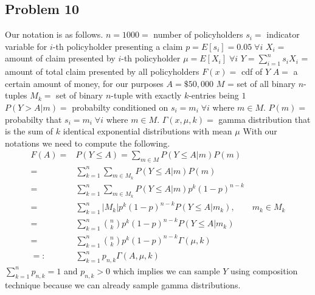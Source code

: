 \documentclass{article}
\begin{document}
\subsection*{Problem 10}
Our notation is as follows.
\newline
$n = 1000 = $ number of policyholders
\newline
$s_i = $ indicator variable for $i$-th policyholder presenting a claim
\newline
$p = E[s_i] = 0.05\;\forall i$
\newline
$X_i = $ amount of claim presented by $i$-th policyholder
\newline
$\mu = E[X_i]\;\forall i$
\newline
$Y = \sum_{i=1}^n s_i X_i$ = amount of total claim presented by all policyholders
\newline
$F(x) = $ cdf of $Y$
\newline
$A = $ a certain amount of money, for our purposes $A = \$50,000$
\newline
$M$ = set of all binary $n$-tuples
\newline
$M_k = $  set of binary $n$-tuple with exactly $k$-entries being $1$
\newline
$P(Y > A|m) = $ probabilty conditioned on $s_i=m_i\;\forall i$ where $m\in M$.
\newline
$P(m) = $ probabilty that $s_i = m_i\;\forall i$ where $m\in M$.
\newline
$\Gamma(x, \mu, k) = $ gamma distribution that is the sum of $k$ identical exponential distributions with mean $\mu$
With our notations we need to compute the following.
\begin{align*}
F(A) =& P(Y \le A) = \sum_{m\in M}P(Y \le A| m)P(m) \\
=& \sum_{k=1}^n\sum_{m\in M_k}P(Y \le A| m)P(m) \\
=& \sum_{k=1}^n\sum_{m\in M_k}P(Y \le A| m)p^k(1-p)^{n-k} \\
=& \sum_{k=1}^n |M_k|p^k(1-p)^{n-k} P(Y \le A| m_k) ,\qquad m_k\in M_k \\
=& \sum_{k=1}^n \binom{n}{k}p^k(1-p)^{n-k}P(Y \le A| m_k) \\
=& \sum_{k=1}^n \binom{n}{k}p^k(1-p)^{n-k}\Gamma(\mu, k) \\
=:& \sum_{k=1}^n p_{n,k}\Gamma(A, \mu, k)
\end{align*}
$\sum_{k=1}^n p_{n,k} = 1$ and $p_{n,k} > 0$ which implies we can sample $Y$ using composition technique because we can already sample gamma distributions.
\end{document}
